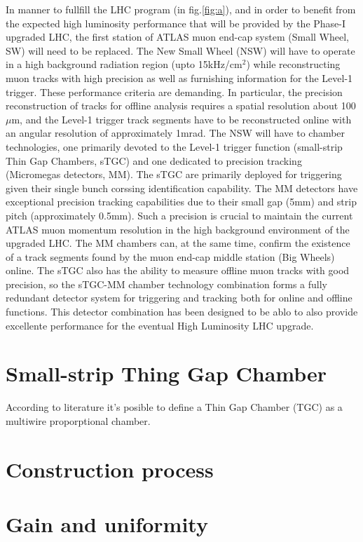 In manner to fullfill the LHC program (in fig.\ref{fig:a}), and in order to benefit from the expected high luminosity performance that will be provided by the Phase-I upgraded LHC, the first station of ATLAS muon end-cap system (Small Wheel, SW) will need to be replaced. The New Small Wheel (NSW) will have to operate in a high background radiation region (upto 15kHz/cm$^2$) while reconstructing muon tracks with high precision as well as furnishing information for the Level-1 trigger. These performance criteria are demanding. In particular, the precision reconstruction of tracks for offline analysis requires a spatial resolution about 100 $\mu$m, and the Level-1 trigger track segments have to be reconstructed online with an angular resolution of approximately 1mrad. The NSW will have to chamber technologies, one primarily devoted to the Level-1 trigger function (small-strip Thin Gap Chambers, sTGC) and one dedicated to precision tracking (Micromegas detectors, MM). The sTGC are primarily deployed for triggering given their single bunch corssing identification capability. The MM detectors have exceptional precision tracking capabilities due to their small gap (5mm) and strip pitch (approximately 0.5mm). Such a precision is crucial to maintain the current ATLAS muon momentum resolution in the high background environment of the upgraded LHC. The MM chambers can, at the same time, confirm the existence of a track segments found by the muon end-cap middle station (Big Wheels) online. The sTGC also has the ability to measure offline muon tracks with good precision, so the sTGC-MM chamber technology combination forms a fully redundant detector system for triggering and tracking both for online and offline functions. This detector combination has been designed to be ablo to also provide excellente performance for the eventual High Luminosity LHC upgrade. 



\section{Small-strip Thing Gap Chamber}
According to literature it's posible to define a Thin Gap Chamber (TGC) as a multiwire proporptional chamber.\par

\section{Construction process}

\section{Gain and uniformity}

